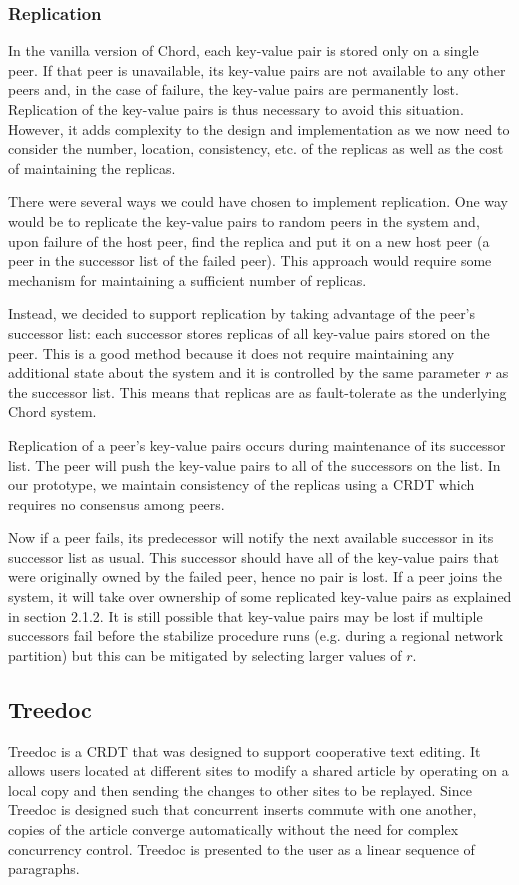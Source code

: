 \documentclass[twocolumn]{article}
\begin{document}
\subsubsection{Replication}
In the vanilla version of Chord, each key-value pair is stored only on a single peer. If that peer is unavailable, its key-value pairs are not available to any other peers and, in the case of failure, the key-value pairs are permanently lost. Replication of the key-value pairs is thus necessary to avoid this situation. However, it adds complexity to the design and implementation as we now need to consider the number, location, consistency, etc. of the replicas as well as the cost of maintaining the replicas.

There were several ways we could have chosen to implement replication. One way would be to replicate the key-value pairs to random peers in the system and, upon failure of the host peer, find the replica and put it on a new host peer (a peer in the successor list of the failed peer). This approach would require some mechanism for maintaining a sufficient number of replicas.

Instead, we decided to support replication by taking advantage of the peer's successor list: each successor stores replicas of all key-value pairs stored on the peer. This is a good method because it does not require maintaining any additional state about the system and it is controlled by the same parameter $r$ as the successor list. This means that replicas are as fault-tolerate as the underlying Chord system.

Replication of a peer's key-value pairs occurs during maintenance of its successor list. The peer will push the key-value pairs to all of the successors on the list. In our prototype, we maintain consistency of the replicas using a CRDT which requires no consensus among peers.

Now if a peer fails, its predecessor will notify the next available successor in its successor list as usual. This successor should have all of the key-value pairs that were originally owned by the failed peer, hence no pair is lost. If a peer joins the system, it will take over ownership of some replicated key-value pairs as explained in section 2.1.2. It is still possible that key-value pairs may be lost if multiple successors fail before the stabilize procedure runs (e.g. during a regional network partition) but this can be mitigated by selecting larger values of $r$.

\subsection{Treedoc}
Treedoc is a CRDT that was designed to support cooperative text editing. It allows users located at different sites to modify a shared article by operating on a local copy and then sending the changes to other sites to be replayed. Since Treedoc is designed such that concurrent inserts commute with one another, copies of the article converge automatically without the need for complex concurrency control. Treedoc is presented to the user as a linear sequence of paragraphs.
\end{document}
